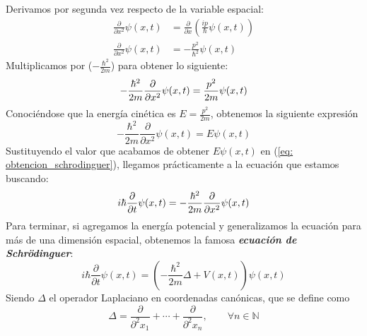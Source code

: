 \documentclass[12pt]{article}
\numberwithin{equation}{section} %
\begin{document}
    Derivamos por segunda vez respecto de la variable espacial:
    \begin{align*}
        \frac{\partial}{\partial x^{2}} \psi(x, t) &= \frac{\partial}{\partial x} \left( \frac{ip}{\hbar} \psi(x, t) \right) \\[10pt]
        \frac{\partial}{\partial x^{2}} \psi(x, t) &= - \frac{p^{2}}{\hbar^{2}} \psi(x, t)
    \end{align*}
    Multiplicamos por (\( - \frac{\hbar^{2}}{2m} \)) para obtener lo siguiente:
    \begin{equation*}
        - \frac{\hbar^{2}}{2m} \frac{\partial}{\partial x^{2}} \psi(x, t) = \frac{p^{2}}{2m} \psi(x, t)
        \\[2mm]
    \end{equation*}
    Conociéndose que la energía cinética es \( E = \frac{p^{2}}{2m} \), obtenemos la siguiente expresión
    \begin{equation*}
        - \frac{\hbar^{2}}{2m} \frac{\partial}{\partial x^{2}} \psi(x, t) = E \psi(x, t)
    \end{equation*}
    Sustituyendo el valor que acabamos de obtener \( E \psi(x, t) \) en (\ref{eq: obtencion_schrodinguer}), llegamos prácticamente a la ecuación que estamos buscando:
    \begin{equation*}
        i \hbar \frac{\partial}{\partial t} \psi(x, t) = - \frac{\hbar^{2}}{2m} \frac{\partial}{\partial x^{2}} \psi(x, t)
        \\[2mm]
    \end{equation*}
    Para terminar, si agregamos la energía potencial y generalizamos la ecuación para más de una dimensión espacial, obtenemos la famosa \textbf{\textit{ecuación de Schrödinguer}}:
    \begin{equation}
        \boxed{i \hbar \frac{\partial}{\partial t} \psi(x, t) = (- \frac{\hbar^{2}}{2m} \Delta + V(x, t)) \psi(x, t)} 
        \label{eq: ecuacion_schrodinguer}     
    \end{equation}
    Siendo \( \Delta \) el operador Laplaciano en coordenadas canónicas, que se define como
    \begin{equation*}
        \Delta = \frac{\partial}{\partial^{2} x_{1}} + \cdots + \frac{\partial}{\partial^{2} x_{n}}, \qquad \forall n \in \mathbb{N}
    \end{equation*}

    \vspace{5mm}
\end{document}
